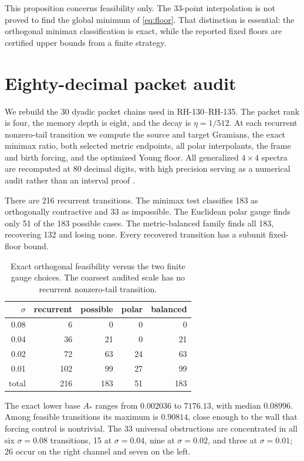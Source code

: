 \documentclass[12pt]{article}
\begin{document}
This proposition concerns feasibility only.  The 33-point interpolation is
not proved to find the global minimum of \eqref{eq:floor}.  That distinction
is essential: the orthogonal minimax classification is exact, while the
reported fixed floors are certified upper bounds from a finite strategy.

\section{Eighty-decimal packet audit}
We rebuild the 30 dyadic packet chains used in RH-130--RH-135.  The packet
rank is four, the memory depth is eight, and the decay is $\eta=1/512$.  At
each recurrent nonzero-tail transition we compute the source and target
Gramians, the exact minimax ratio, both selected metric endpoints, all polar
interpolants, the frame and birth forcing, and the optimized Young floor.
All generalized $4\times4$ spectra are recomputed at 80 decimal digits, with
high precision serving as a numerical audit rather than an interval proof
\citep{Higham2002}.

There are 216 recurrent transitions.  The minimax test classifies 183 as
orthogonally contractive and 33 as impossible.  The Euclidean polar gauge
finds only 51 of the 183 possible cases.  The metric-balanced family finds
all 183, recovering 132 and losing none.  Every recovered transition has a
subunit fixed-floor bound.

\begin{table}[t]
\centering
\begin{tabular}{rrrrr}
\toprule
$\sigma$ & recurrent & possible & polar & balanced \\
\midrule
0.08 & 6   & 0  & 0  & 0 \\
0.04 & 36  & 21 & 0  & 21 \\
0.02 & 72  & 63 & 24 & 63 \\
0.01 & 102 & 99 & 27 & 99 \\
\midrule
total & 216 & 183 & 51 & 183 \\
\bottomrule
\end{tabular}
\caption{Exact orthogonal feasibility versus the two finite gauge choices.
The coarsest audited scale has no recurrent nonzero-tail transition.}
\label{tab:counts}
\end{table}

The exact lower base $A_*$ ranges from $0.002036$ to $7176.13$, with median
$0.08996$.  Among feasible transitions its maximum is $0.90814$, close
enough to the wall that forcing control is nontrivial.  The 33 universal
obstructions are concentrated in all six $\sigma=0.08$ transitions, 15 at
$\sigma=0.04$, nine at $\sigma=0.02$, and three at $\sigma=0.01$; 26 occur
on the right channel and seven on the left.
\end{document}
